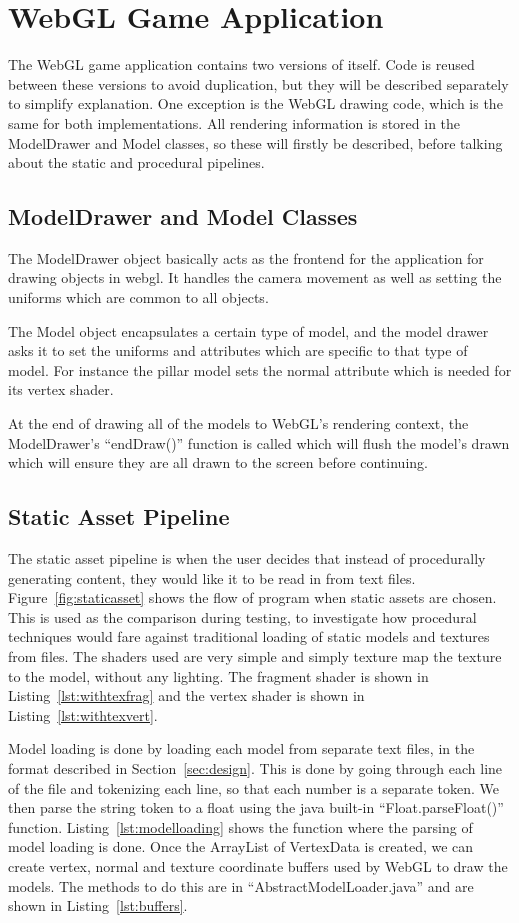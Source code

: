 \section{WebGL Game Application}
The WebGL game application contains two versions of itself.
Code is reused between these versions to avoid duplication, but they will be described separately to simplify explanation.
One exception is the WebGL drawing code, which is the same for both implementations.
All rendering information is stored in the ModelDrawer and Model classes, so these will firstly be described, before talking about the static and procedural pipelines.

\subsection{ModelDrawer and Model Classes}
The ModelDrawer object basically acts as the frontend for the application for drawing objects in webgl.
It handles the camera movement as well as setting the uniforms which are common to all objects.

The Model object encapsulates a certain type of model, and the model drawer asks it to set the uniforms and attributes which are specific to that type of model.
For instance the pillar model sets the normal attribute which is needed for its vertex shader.

At the end of drawing all of the models to WebGL's rendering context, the ModelDrawer's ``endDraw()'' function is called which will flush the model's drawn which will ensure they are all drawn to the screen before continuing.

\subsection{Static Asset Pipeline}
\label{sec:staticassetimpl}
The static asset pipeline is when the user decides that instead of procedurally generating content, they would like it to be read in from text files.
Figure~\ref{fig:staticasset} shows the flow of program when static assets are chosen.
This is used as the comparison during testing, to investigate how procedural techniques would fare against traditional loading of static models and textures from files.
The shaders used are very simple and simply texture map the texture to the model, without any lighting.
The fragment shader is shown in Listing~\ref{lst:withtexfrag} and the vertex shader is shown in Listing~\ref{lst:withtexvert}.

Model loading is done by loading each model from separate text files, in the format described in Section~\ref{sec:design}.
This is done by going through each line of the file and tokenizing each line, so that each number is a separate token.
We then parse the string token to a float using the java built-in ``Float.parseFloat()'' function.
Listing~\ref{lst:modelloading} shows the function where the parsing of model loading is done.
Once the ArrayList of VertexData is created, we can create vertex, normal and texture coordinate buffers used by WebGL to draw the models.
The methods to do this are in ``AbstractModelLoader.java'' and are shown in Listing~\ref{lst:buffers}.

